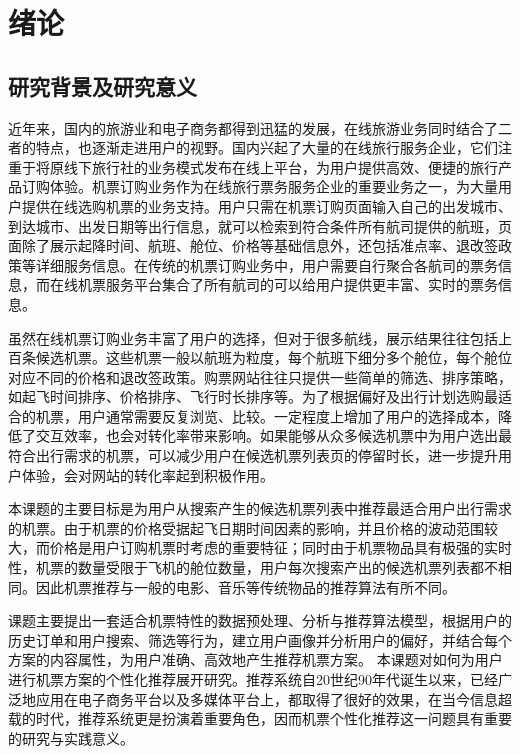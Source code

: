 
\chapter{绪论 }
\label{chap:intro}


\section{研究背景及研究意义}
近年来，国内的旅游业和电子商务都得到迅猛的发展，在线旅游业务同时结合了二者的特点，也逐渐走进用户的视野。国内兴起了大量的在线旅行服务企业，它们注重于将原线下旅行社的业务模式发布在线上平台，为用户提供高效、便捷的旅行产品订购体验。机票订购业务作为在线旅行票务服务企业的重要业务之一，为大量用户提供在线选购机票的业务支持。用户只需在机票订购页面输入自己的出发城市、到达城市、出发日期等出行信息，就可以检索到符合条件所有航司提供的航班，页面除了展示起降时间、航班、舱位、价格等基础信息外，还包括准点率、退改签政策等详细服务信息。在传统的机票订购业务中，用户需要自行聚合各航司的票务信息，而在线机票服务平台集合了所有航司的可以给用户提供更丰富、实时的票务信息。

虽然在线机票订购业务丰富了用户的选择，但对于很多航线，展示结果往往包括上百条候选机票。这些机票一般以航班为粒度，每个航班下细分多个舱位，每个舱位对应不同的价格和退改签政策。购票网站往往只提供一些简单的筛选、排序策略，如起飞时间排序、价格排序、飞行时长排序等。为了根据偏好及出行计划选购最适合的机票，用户通常需要反复浏览、比较。一定程度上增加了用户的选择成本，降低了交互效率，也会对转化率带来影响。如果能够从众多候选机票中为用户选出最符合出行需求的机票，可以减少用户在候选机票列表页的停留时长，进一步提升用户体验，会对网站的转化率起到积极作用。

本课题的主要目标是为用户从搜索产生的候选机票列表中推荐最适合用户出行需求的机票。由于机票的价格受据起飞日期时间因素的影响，并且价格的波动范围较大，而价格是用户订购机票时考虑的重要特征；同时由于机票物品具有极强的实时性，机票的数量受限于飞机的舱位数量，用户每次搜索产出的候选机票列表都不相同。因此机票推荐与一般的电影、音乐等传统物品的推荐算法有所不同。



课题主要提出一套适合机票特性的数据预处理、分析与推荐算法模型，根据用户的历史订单和用户搜索、筛选等行为，建立用户画像并分析用户的偏好，并结合每个方案的内容属性，为用户准确、高效地产生推荐机票方案。
本课题对如何为用户进行机票方案的个性化推荐展开研究。推荐系统自20世纪90年代诞生以来，已经广泛地应用在电子商务平台以及多媒体平台上，都取得了很好的效果，在当今信息超载的时代，推荐系统更是扮演着重要角色，因而机票个性化推荐这一问题具有重要的研究与实践意义。

